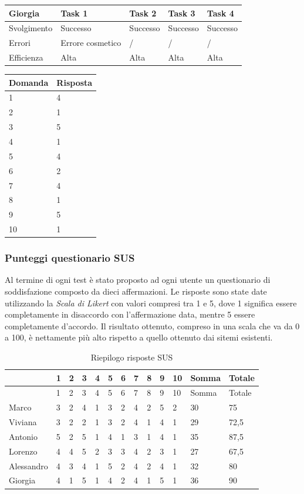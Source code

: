 \documentclass[12pt,italian,]{report}
\begin{document}
\begin{longtable}[]{@{}lllll@{}}
\toprule
Giorgia & Task 1 & Task 2 & Task 3 & Task 4\tabularnewline
\midrule
\endhead
Svolgimento & Successo & Successo & Successo & Successo\tabularnewline
Errori & Errore cosmetico & / & / & /\tabularnewline
Efficienza & Alta & Alta & Alta & Alta\tabularnewline
\bottomrule
\end{longtable}

\begin{longtable}[]{@{}ll@{}}
\toprule
Domanda & Risposta\tabularnewline
\midrule
\endhead
1 & 4\tabularnewline
2 & 1\tabularnewline
3 & 5\tabularnewline
4 & 1\tabularnewline
5 & 4\tabularnewline
6 & 2\tabularnewline
7 & 4\tabularnewline
8 & 1\tabularnewline
9 & 5\tabularnewline
10 & 1\tabularnewline
\bottomrule
\end{longtable}

\hypertarget{punteggi-questionario-sus}{%
\subsubsection{Punteggi questionario
SUS}\label{punteggi-questionario-sus}}

Al termine di ogni test è stato proposto ad ogni utente un questionario
di soddisfazione composto da dieci affermazioni. Le risposte sono state
date utilizzando la \emph{Scala di Likert} con valori compresi tra 1 e
5, dove 1 significa essere completamente in disaccordo con
l'affermazione data, mentre 5 essere completamente d'accordo. Il
risultato ottenuto, compreso in una scala che va da 0 a 100, è
nettamente più alto rispetto a quello ottenuto dai sitemi esistenti.

\begin{longtable}[]{@{}lllllllllllll@{}}
\caption{Riepilogo risposte SUS}\tabularnewline
\toprule
& 1 & 2 & 3 & 4 & 5 & 6 & 7 & 8 & 9 & 10 & Somma & Totale\tabularnewline
\midrule
\endfirsthead
\toprule
& 1 & 2 & 3 & 4 & 5 & 6 & 7 & 8 & 9 & 10 & Somma & Totale\tabularnewline
\midrule
\endhead
Marco & 3 & 2 & 4 & 1 & 3 & 2 & 4 & 2 & 5 & 2 & 30 & 75\tabularnewline
Viviana & 3 & 2 & 2 & 1 & 3 & 2 & 4 & 1 & 4 & 1 & 29 &
72,5\tabularnewline
Antonio & 5 & 2 & 5 & 1 & 4 & 1 & 3 & 1 & 4 & 1 & 35 &
87,5\tabularnewline
Lorenzo & 4 & 4 & 5 & 2 & 3 & 3 & 4 & 2 & 3 & 1 & 27 &
67,5\tabularnewline
Alessandro & 4 & 3 & 4 & 1 & 5 & 2 & 4 & 2 & 4 & 1 & 32 &
80\tabularnewline
Giorgia & 4 & 1 & 5 & 1 & 4 & 2 & 4 & 1 & 5 & 1 & 36 & 90\tabularnewline
\bottomrule
\end{longtable}
\end{document}
